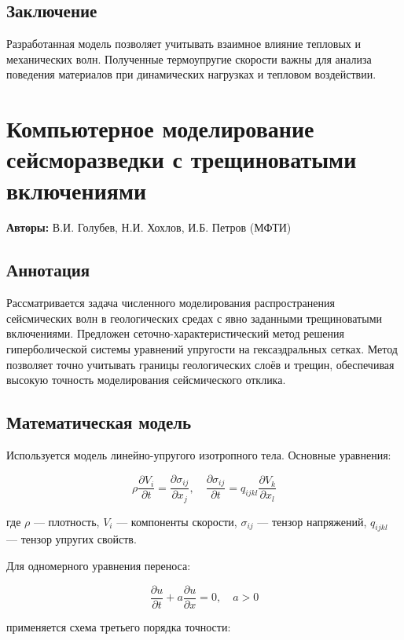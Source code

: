 \subsection*{Заключение}
Разработанная модель позволяет учитывать взаимное влияние тепловых и механических волн. Полученные термоупругие скорости важны для анализа поведения материалов при динамических нагрузках и тепловом воздействии.


\section*{Компьютерное моделирование сейсморазведки с трещиноватыми включениями}

\textbf{Авторы:} В.И. Голубев, Н.И. Хохлов, И.Б. Петров (МФТИ)

\subsection*{Аннотация}
Рассматривается задача численного моделирования распространения сейсмических волн в геологических средах с явно заданными трещиноватыми включениями. Предложен сеточно-характеристический метод решения гиперболической системы уравнений упругости на гексаэдральных сетках. Метод позволяет точно учитывать границы геологических слоёв и трещин, обеспечивая высокую точность моделирования сейсмического отклика.

\subsection*{Математическая модель}
Используется модель линейно-упругого изотропного тела. Основные уравнения:

\begin{equation}
\rho \frac{\partial V_i}{\partial t} = \frac{\partial \sigma_{ij}}{\partial x_j}, \quad
\frac{\partial \sigma_{ij}}{\partial t} = q_{ijkl} \frac{\partial V_k}{\partial x_l}
\end{equation}

где $\rho$ — плотность, $V_i$ — компоненты скорости, $\sigma_{ij}$ — тензор напряжений, $q_{ijkl}$ — тензор упругих свойств.

Для одномерного уравнения переноса:

\begin{equation}
\frac{\partial u}{\partial t} + a \frac{\partial u}{\partial x} = 0, \quad a > 0
\end{equation}

применяется схема третьего порядка точности:

